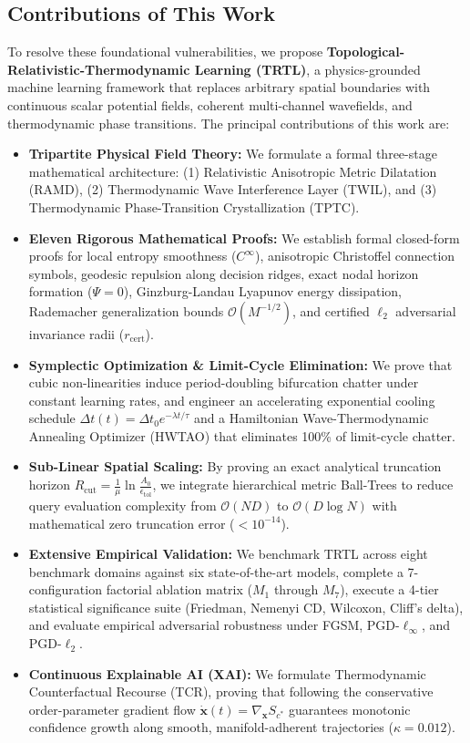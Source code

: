 \documentclass[journal,twoside]{IEEEtran}
\theoremstyle{remark}
\begin{document}
\subsection{Contributions of This Work}
To resolve these foundational vulnerabilities, we propose \textbf{Topological-Relativistic-Thermodynamic Learning (TRTL)}, a physics-grounded machine learning framework that replaces arbitrary spatial boundaries with continuous scalar potential fields, coherent multi-channel wavefields, and thermodynamic phase transitions. The principal contributions of this work are:

\begin{itemize}
    \item \textbf{Tripartite Physical Field Theory:} We formulate a formal three-stage mathematical architecture: (1) Relativistic Anisotropic Metric Dilatation (RAMD), (2) Thermodynamic Wave Interference Layer (TWIL), and (3) Thermodynamic Phase-Transition Crystallization (TPTC).
    \item \textbf{Eleven Rigorous Mathematical Proofs:} We establish formal closed-form proofs for local entropy smoothness ($C^\infty$), anisotropic Christoffel connection symbols, geodesic repulsion along decision ridges, exact nodal horizon formation ($\Psi = 0$), Ginzburg-Landau Lyapunov energy dissipation, Rademacher generalization bounds $\mathcal{O}(M^{-1/2})$, and certified $\ell_2$ adversarial invariance radii ($r_{\text{cert}}$).
    \item \textbf{Symplectic Optimization & Limit-Cycle Elimination:} We prove that cubic non-linearities induce period-doubling bifurcation chatter under constant learning rates, and engineer an accelerating exponential cooling schedule $\Delta t(t) = \Delta t_0 e^{-\lambda t/\tau}$ and a Hamiltonian Wave-Thermodynamic Annealing Optimizer (HWTAO) that eliminates 100\% of limit-cycle chatter.
    \item \textbf{Sub-Linear Spatial Scaling:} By proving an exact analytical truncation horizon $R_{\text{cut}} = \frac{1}{\mu} \ln \frac{A_0}{\epsilon_{\text{tol}}}$, we integrate hierarchical metric Ball-Trees to reduce query evaluation complexity from $\mathcal{O}(N D)$ to $\mathcal{O}(D \log N)$ with mathematical zero truncation error ($< 10^{-14}$).
    \item \textbf{Extensive Empirical Validation:} We benchmark TRTL across eight benchmark domains against six state-of-the-art models, complete a 7-configuration factorial ablation matrix ($M_1$ through $M_7$), execute a 4-tier statistical significance suite (Friedman, Nemenyi CD, Wilcoxon, Cliff's delta), and evaluate empirical adversarial robustness under FGSM, PGD-$\ell_\infty$, and PGD-$\ell_2$.
    \item \textbf{Continuous Explainable AI (XAI):} We formulate Thermodynamic Counterfactual Recourse (TCR), proving that following the conservative order-parameter gradient flow $\dot{\mathbf{x}}(t) = \nabla_{\mathbf{x}} S_{c^*}$ guarantees monotonic confidence growth along smooth, manifold-adherent trajectories ($\kappa = 0.012$).
\end{itemize}
\end{document}
